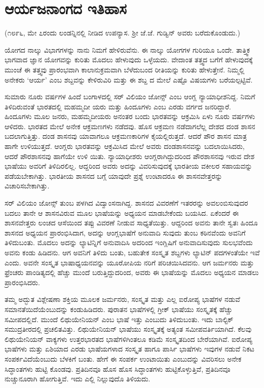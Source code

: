 
\chapter{ಆರ್ಯಜನಾಂಗದ ಇತಿಹಾಸ}

(೧೮೯೬, ಮೇ ೭ರಂದು ಲಂಡನ್ನಿನಲ್ಲಿ ನೀಡಿದ ಉಪನ್ಯಾಸ. ಶ‍್ರೀ ಜೆ.ಜೆ. ಗುಡ್ವಿನ್ ಅವರು ಬರೆದುಕೊಂಡುದು.)

ಯೋಗದ ನಾಲ್ಕು ವಿಭಾಗಗಳನ್ನು ನಾನು ನಿಮಗೆ ಹೇಳಿರುವೆನು. ಈ ನಾಲ್ಕು ಯೋಗಗಳ ಗುರಿಯೂ ಒಂದೇ. ತಾತ್ತ್ವಿಕ ಭಾಗವಾದ ಜ್ಞಾನ ಯೋಗವನ್ನು ಕುರಿತು ಮೊದಲು ಹೇಳುವುದು ಒಳ್ಳೆಯದು. ವೇದಾಂತ ತತ್ತ್ವದ ಬಗೆಗೆ ಹೇಳುವುದಕ್ಕೆ ಮುಂಚೆ ಈ ತತ್ತ್ವವು ಪ್ರಾರಂಭವಾಗಿ ಕಾಲಾನುಕ್ರಮವಾಗಿ ಬೆಳೆದುಬಂದ ರೀತಿಯನ್ನು ಕುರಿತು ಹೇಳುತ್ತೇನೆ. ನಿಮ್ಮಲ್ಲಿ ಅನೇಕರು ‘ಆರ್ಯ’ ಎಂಬ ಶಬ್ದವನ್ನು ಕೇಳಿರುವಿರಿ ಮತ್ತು ಈ ಶಬ್ದ ದ ಮೇಲೆ ಎಷ್ಟೊ ವಿಷಯಗಳು ಬರೆಯಲ್ಪಟ್ಟಿವೆ.

ಸುಮಾರು ನೂರು ವರ್ಷಗಳ ಹಿಂದೆ ಬಂಗಾಳದಲ್ಲಿ ಸರ್ ವಿಲಿಯಂ ಜೋನ್ಸ್ ಎಂಬ ಆಂಗ್ಲ ನ್ಯಾಯಾಧೀಶನಿದ್ದ. ನಿಮಗೆ ತಿಳಿದಿರುವಂತೆ ಭಾರತದಲ್ಲಿ ಮಹಮ್ಮದೀ ಯರು ಮತ್ತು ಹಿಂದೂಗಳು ಎಂಬ ಎರಡು ವರ್ಗದ ಜನರಿದ್ದಾರೆ. ಹಿಂದೂಗಳು ಮೂಲ ಜನರು, ಮಹಮ್ಮದೀಯರು ಅನಂತರ ಬಂದು ಭಾರತವನ್ನು ಆಕ್ರಮಿಸಿ ಏಳು ನೂರು ವರ್ಷಗಳು ಆಳಿದರು. ಭಾರತದ ಮೇಲೆ ಅನೇಕ ಆಕ್ರಮಣಗಳು ನಡೆದವು. ಹೊಸ ಆಕ್ರಮಣ ನಡೆದಾಗಲೆಲ್ಲ ದೇಶದ ದಂಡ ಶಾಸನ ಬದಲಾಗುತ್ತಿತ್ತು. ದಂಡ ಶಾಸನವು ಯಾವಾಗಲೂ ಆಕ್ರಮಣಕಾರಿಗಳ ಕೈಯಲ್ಲಿರುತ್ತದೆ. ಆದರೆ ಪೌರ ಶಾಸನ ಮಾತ್ರ ಹಾಗೇ ಉಳಿಯುತ್ತದೆ. ಆಂಗ್ಲರು ಭಾರತವನ್ನು ಆಕ್ರಮಿಸಿದ ಮೇಲೆ ಅವರು ದಂಡಶಾಸನವನ್ನು ಬದಲಾಯಿಸಿದರು, ಆದರೆ ಪೌರಶಾಸನವು ಹಾಗೆಯೇ ಉಳಿ ಯಿತು. ನ್ಯಾಯಾಧೀಶರು ಆಂಗ್ಲರಾಗಿದ್ದುದರಿಂದ ಪೌರಶಾಸನವು ಇರುವ ದೇಶ ಭಾಷೆಯು ಅವರಿಗೆ ತಿಳಿದಿರಲಿಲ್ಲ. ಆದ್ದರಿಂದ ಅವರು ಅದನ್ನು ವಿವರಿಸುವುದಕ್ಕೆ ಭಾರತೀಯ ವಕೀಲರ ಸಹಾಯವನ್ನು ಪಡೆಯಬೇಕಾಗಿತ್ತು. ಭಾರತೀಯ ಶಾಸನದ ಬಗ್ಗೆ ಯಾವುದೇ ಪ್ರಶ್ನೆ ಉಂಟಾದರೂ ಈ ಶಾಸನವೇತ್ತರನ್ನು ವಿಚಾರಿಸಬೇಕಾಗಿತ್ತು.

ಸರ್ ವಿಲಿಯಂ ಜೋನ್ಸ್ ತುಂಬ ಪಳಗಿದ ವಿದ್ವಾಂಸನಾಗಿದ್ದ. ಶಾಸನದ ವಿವರಣೆಗೆ ಇತರರನ್ನು ಅವಲಂಬಿಸುವುದರ ಬದಲು ತಾನೇ ಆ ಶಾಸನವಿರುವ ಮೂಲ ಭಾಷೆಯನ್ನು ಅಧ್ಯಯನ ಮಾಡಬೇಕೆಂದು ಬಯಸಿದ. ಏಕೆಂದರೆ ಈ ಶಾಸನವೇತ್ತರು ಲಂಚದ ಆಸೆಯಿಂದ ತಪ್ಪು ವಿವರಣೆ ನೀಡುವ ಸಾಧ್ಯತೆಯಿತ್ತು. ಆದ್ದರಿಂದ ಅವನು ತಾನೇ ಸ್ವತಃ ಹಿಂದೂ ಶಾಸನದ ಅಧ್ಯಯನ ಪ್ರಾರಂಭಿಸಿದಾಗ, ಅದನ್ನು ಆಂಗ್ಲಭಾಷೆಗೆ ಅನುವಾದಿ ಸುವುದು ತುಂಬ ಕಠಿನವೆಂದು ಅವನಿಗೆ ತಿಳಿದುಬಂತು. ಮೊದಲು ಅದನ್ನು ಲ್ಯಾಟಿನ್ನಿಗೆ ಅನುವಾದಿಸಿ ಅದರಿಂದ ಇಂಗ್ಲಿಷಿಗೆ ಅನುವಾದಿಸುವುದು ಸುಲಭವೆಂದು ಅವನು ಕಂಡು ಹಿಡಿದನು. ಆಗ ಅವನಿಗೆ ತಿಳಿದು ಬಂತು, ಬಹುತೇಕ ಸಂಸ್ಕೃತ ಶಬ್ದಗಳು ಲ್ಯಾಟಿನ್ ಪದಗಳಂತೆಯೇ ಇವೆ ಎಂದು. ಅವನೇ ಸಂಸ್ಕೃತ ಭಾಷಾಧ್ಯಯನವನ್ನು ಯೂರೋಪಿಯ ನರಿಗೆ ಪರಿಚಯಿಸಿದವನು. ಆಗ ಜರ್ಮನರು ಮತ್ತು ಫ್ರೆಂಚರು ಪಾಂಡಿತ್ಯದಲ್ಲಿ ಹೆಚ್ಚು ಮುಂದೆ ಬರುತ್ತಿದ್ದುದರಿಂದ, ಅವರು ಈ ಭಾಷೆಯನ್ನು ಮೊದಲು ಅಧ್ಯಯನ ಮಾಡಲು ಪ್ರಾರಂಭಿಸಿದರು.

ತಮ್ಮ ಅದ್ಭುತ ವಿಶ್ಲೇಷಣಾ ಶಕ್ತಿಯ ಮೂಲಕ ಜರ್ಮನರು, ಸಂಸ್ಕೃತ ಮತ್ತು ಎಲ್ಲ ಐರೋಪ್ಯ ಭಾಷೆಗಳ ನಡುವೆ ಸಮಾನತೆಯಿದೆಯೆಂಬುದನ್ನು ಕಂಡುಹಿಡಿದರು. ಪುರಾತನ ಭಾಷೆಗಳಲ್ಲಿ ಗ್ರೀಕ್ ಭಾಷೆಯು ಸಂಸ್ಕೃತಕ್ಕೆ ಹೆಚ್ಚು ಸಮೀಪದಲ್ಲಿದೆ. ಮುಂದೆ ಲಿಥುಯೇನಿಯನ್ ಎಂಬ ಭಾಷೆ ಇತ್ತು ಎಂಬುದು ತಿಳಿದುಬಂತು. ಇದು ಬಾಲ್ಟಿಕ್ ಸಮುದ್ರತೀರದಲ್ಲಿ ಪ್ರಚಲಿತವಿತ್ತು. ಲಿಥುಯೇನಿಯನ್ ಭಾಷೆಯು ಸಂಸ್ಕೃತಕ್ಕೆ ಅತ್ಯಂತ ಸಮೀಪವರ್ತಿಯಾಗಿದೆ. ಕೆಲವು ಲಿಥುಯೇನಿಯನ್ ವಾಕ್ಯಗಳು ಉತ್ತರಭಾರತದ ಭಾಷೆಗಳಿಗಿಂತಲೂ ಕಡಿಮೆ ಸಂಸ್ಕೃತದಿಂದ ಬೇರೆಯಾಗಿವೆ. ಐರೋಪ್ಯ ಭಾಷೆಗಳು ಮತ್ತು ಏಶಿಯಾದ ಎರಡು ಭಾಷೆಯಗಳಾದ ಸಂಸ್ಕೃತ ಹಾಗೂ ಪಾರ್ಸಿ ಭಾಷೆಗಳು ಇವುಗಳ ನಡುವೆ ನಿಕಟ ಸಂಪರ್ಕವಿದೆಯೆಂಬುದು ಬೆಳಕಿಗೆ ಬಂತು. ಹೇಗೆ ಈ ಸಂಪರ್ಕ ಉಂಟಾಯಿತು ಎಂಬುದನ್ನು ವಿವರಿಸಲು ಅನೇಕ ಸಿದ್ಧಾಂತಗಳು ಹುಟ್ಟಿ ಕೊಂಡವು. ಪ್ರತಿದಿನವೂ ಹೊಸ ಹೊಸ ಸಿದ್ಧಾಂತಗಳು ಹುಟ್ಟಿಕೊಳ್ಳುತ್ತಿವೆ, ಪ್ರತಿದಿನವೂ ನುಚ್ಚುನೂರಾಗಿ ಹೋಗುತ್ತಿವೆ. ಇದು ಎಲ್ಲಿ ನಿಲ್ಲುವುದೊ ತಿಳಿಯದು.

